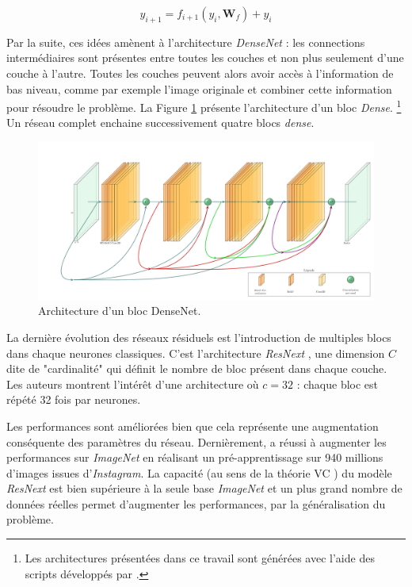 \begin{equation}\label{eq:resnet}
y_{i+1} = f_{i+1}\left(y_{i}, \mathbf{W}_f\right)+y_{i}
\end{equation}

Par la suite, ces idées amènent à l'architecture \textit{DenseNet} \cite{huang_densely_2016} : les connections intermédiaires sont présentes entre toutes les couches et non plus seulement d'une couche à l'autre.
Toutes les couches peuvent alors avoir accès à l'information de bas niveau, comme par exemple l'image originale et combiner cette information pour résoudre le problème.
La Figure \ref{fig:densenet} présente l'architecture d'un bloc \textit{Dense}.
\footnote{Les architectures présentées dans ce travail sont générées avec l'aide des scripts développés par \cite{harisiqbal_harisiqbal88_2018}.}
Un réseau complet enchaine successivement quatre blocs \textit{dense}.

\begin{figure}[hbtp]
    \centering
    \includegraphics[width=\textwidth,height=\textheight,keepaspectratio]{../Chap3/Figures/densenet.pdf}
    \caption{Architecture d'un bloc DenseNet.}
    \label{fig:densenet}
\end{figure}

La dernière évolution des réseaux résiduels est l'introduction de multiples blocs dans chaque neurones classiques.
C'est l'architecture \textit{ResNext} \cite{xie_aggregated_2016}, une dimension $C$ dite de "cardinalité" qui définit le nombre de bloc présent dans chaque couche. Les auteurs montrent l'intérêt d'une architecture où $c = 32$ : chaque bloc est répété 32 fois par neurones. 

Les performances sont améliorées bien que cela représente une augmentation conséquente des paramètres du réseau.
Dernièrement, \cite{mahajan_exploring_2018} a réussi à augmenter les performances sur \textit{ImageNet} en réalisant un pré-apprentissage sur 940 millions d'images issues d'\textit{Instagram}.
La capacité (au sens de la théorie VC \cite{vapnik_principles_1992}) du modèle \textit{ResNext} est bien supérieure à la seule base \textit{ImageNet} et un plus grand nombre de données réelles permet d'augmenter les performances, par la généralisation du problème.

